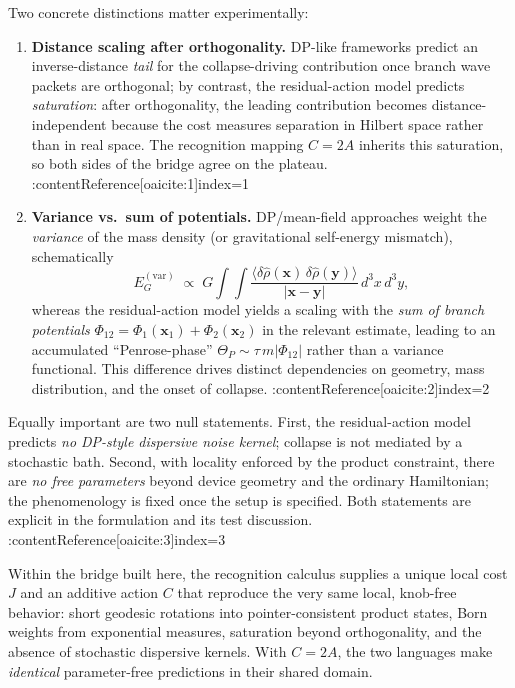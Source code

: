 \documentclass[11pt,letterpaper]{article}
\begin{document}
Two concrete distinctions matter experimentally:
\begin{enumerate}
\item \textbf{Distance scaling after orthogonality.}  
DP-like frameworks predict an inverse-distance \emph{tail} for the collapse-driving contribution once branch wave packets are orthogonal; by contrast, the residual-action model predicts \emph{saturation}: after orthogonality, the leading contribution becomes distance-independent because the cost measures separation in Hilbert space rather than in real space. The recognition mapping $C=2A$ inherits this saturation, so both sides of the bridge agree on the plateau. :contentReference[oaicite:1]{index=1}
\item \textbf{Variance vs.\ sum of potentials.}  
DP/mean-field approaches weight the \emph{variance} of the mass density (or gravitational self-energy mismatch), schematically
\[
E_G^{(\mathrm{var})}\;\propto\;G\int\!\!\int \frac{\langle \delta \hat\rho(\mathbf x)\,\delta \hat\rho(\mathbf y)\rangle}{|\mathbf x-\mathbf y|}\,d^3x\,d^3y,
\]
whereas the residual-action model yields a scaling with the \emph{sum of branch potentials} $\Phi_{12}=\Phi_1(\mathbf x_1)+\Phi_2(\mathbf x_2)$ in the relevant estimate, leading to an accumulated ``Penrose-phase'' $\Theta_P\sim \tau\,m|\Phi_{12}|$ rather than a variance functional. This difference drives distinct dependencies on geometry, mass distribution, and the onset of collapse. :contentReference[oaicite:2]{index=2}
\end{enumerate}

Equally important are two null statements. First, the residual-action model predicts \emph{no DP-style dispersive noise kernel}; collapse is not mediated by a stochastic bath. Second, with locality enforced by the product constraint, there are \emph{no free parameters} beyond device geometry and the ordinary Hamiltonian; the phenomenology is fixed once the setup is specified. Both statements are explicit in the formulation and its test discussion. :contentReference[oaicite:3]{index=3}

Within the bridge built here, the recognition calculus supplies a unique local cost $J$ and an additive action $C$ that reproduce the very same local, knob-free behavior: short geodesic rotations into pointer-consistent product states, Born weights from exponential measures, saturation beyond orthogonality, and the absence of stochastic dispersive kernels. With $C=2A$, the two languages make \emph{identical} parameter-free predictions in their shared domain.
\end{document}
